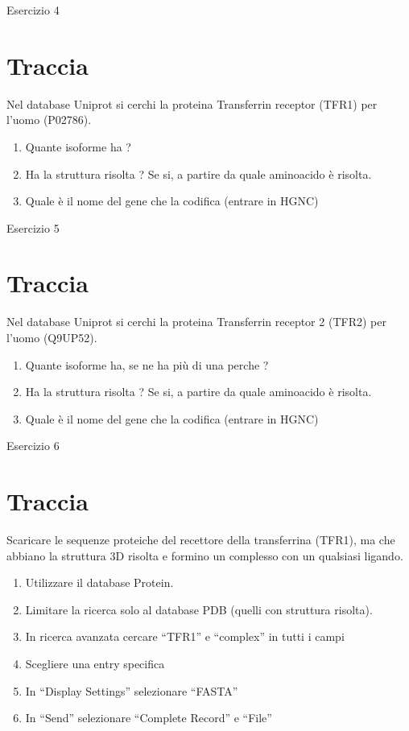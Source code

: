 \documentclass{article}
\begin{document}
\begin{center}
   \huge
   Esercizio 4
\end{center}
\section*{Traccia}
Nel database Uniprot si cerchi la proteina Transferrin receptor (TFR1) per l'uomo (P02786).
\begin{enumerate}
   \item Quante isoforme ha ?
   \item Ha la struttura risolta ? Se si, a partire da quale aminoacido è risolta.
   \item Quale è il nome del gene che la codifica (entrare in HGNC)
\end{enumerate}

\begin{center}
   \huge
   Esercizio 5
\end{center}
\section*{Traccia}
Nel database Uniprot si cerchi la proteina Transferrin receptor 2 (TFR2) per l'uomo (Q9UP52).
\begin{enumerate}
   \item Quante isoforme ha, se ne ha più di una perche ?
   \item Ha la struttura risolta ? Se si, a partire da quale aminoacido è risolta.
   \item Quale è il nome del gene che la codifica (entrare in HGNC)
\end{enumerate}

\begin{center}
   \huge
   Esercizio 6
\end{center}
\section*{Traccia}
Scaricare le sequenze proteiche del recettore della transferrina (TFR1), ma che abbiano la struttura 3D risolta e formino un complesso con un qualsiasi ligando.
\begin{enumerate}
   \item Utilizzare il database Protein.
   \item Limitare la ricerca solo al database PDB (quelli con struttura risolta).
   \item In ricerca avanzata cercare “TFR1” e “complex” in tutti i campi
   \item Scegliere una entry specifica
   \item In “Display Settings” selezionare “FASTA”
   \item In “Send” selezionare “Complete Record” e “File”
\end{enumerate}
\end{document}
